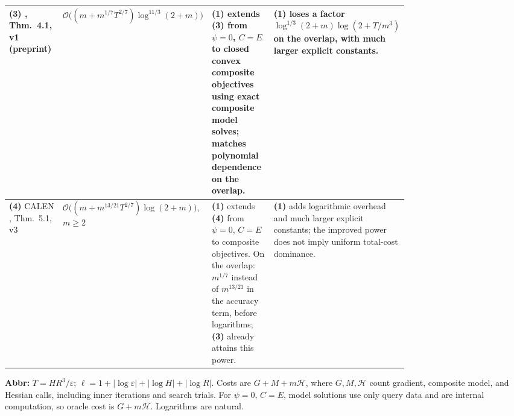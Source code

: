 \begin{table}[tp]
\begin{threeparttable}
\begin{tabularx}{\linewidth}{@{}>{\raggedright\arraybackslash}p{0.20\linewidth}>{\raggedright\arraybackslash}p{0.30\linewidth}>{\raggedright\arraybackslash}p{0.27\linewidth}>{\raggedright\arraybackslash}X@{}}
\midrule
\textbf{(3)} \citep{CompositeLHZhang2026}, Thm.~4.1, v1 (preprint)
& $\mathcal{O}\bigl((m+m^{1/7}T^{2/7})\log^{11/3}(2+m)\bigr)$
& \textbf{(1)} extends \textbf{(3)} from $\psi=0$, $C=E$ to closed convex composite objectives using exact composite model solves; matches polynomial dependence on the overlap.
& \textbf{(1)} loses a factor $\log^{1/3}(2+m)\log(2+T/m^3)$ on the overlap, with much larger explicit constants. \\
\midrule
\textbf{(4)} CALEN \citep{CompositeLHChen2026}, Thm.~5.1, v3
& $\mathcal{O}\bigl((m+m^{13/21}T^{2/7})\log(2+m)\bigr)$, $m\ge2$
& \textbf{(1)} extends \textbf{(4)} from $\psi=0$, $C=E$ to composite objectives. On the overlap: $m^{1/7}$ instead of $m^{13/21}$ in the accuracy term, before logarithms; \textbf{(3)} already attains this power.
& \textbf{(1)} adds logarithmic overhead and much larger explicit constants; the improved power does not imply uniform total-cost dominance. \\
\bottomrule
\end{tabularx}
\begin{tablenotes}[flushleft]\footnotesize
\item[] \textbf{Abbr:} $T=HR^3/\varepsilon$; $\ell=1+|\log\varepsilon|+|\log H|+|\log R|$. Costs are $G+M+m\mathcal{H}$, where $G,M,\mathcal{H}$ count gradient, composite model, and Hessian calls, including inner iterations and search trials. For $\psi=0$, $C=E$, model solutions use only query data and are internal computation, so oracle cost is $G+m\mathcal{H}$. Logarithms are natural.
\end{tablenotes}
\end{threeparttable}
\end{table}
\clearpage
